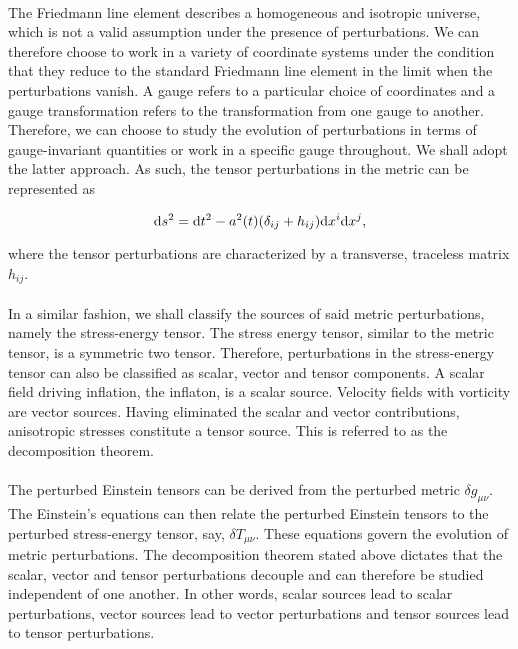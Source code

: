 \documentclass[12pt,a4paper,oneside]{book}
\begin{document}
\paragraph*{} The Friedmann line element describes a homogeneous and isotropic universe, which is not a valid assumption 
under the presence of perturbations. We can therefore choose to work in a variety of coordinate systems under the condition 
that they reduce to the standard Friedmann line element in the limit when the perturbations vanish. A gauge refers to a 
particular choice of coordinates and a gauge transformation refers to the transformation from one gauge to another. 
Therefore, we can choose to study the evolution of perturbations in terms of gauge-invariant quantities or work in a 
specific gauge throughout. We shall adopt the latter approach. As such, the tensor perturbations in the metric can be 
represented as 

\begin{equation}\label{tpmetric}
{\rm d}s^2 = {\rm d}t^2 - a^2(t)(\delta_{ij} + h_{ij}){\rm d}x^i{\rm d}x^j,
\end{equation}

\noindent where the tensor perturbations are characterized by a transverse, traceless matrix $h_{ij}$. 

\paragraph*{}  In a similar fashion, we shall classify the sources of said metric perturbations, namely the stress-energy tensor. 
The stress energy tensor, similar to the metric tensor, is a symmetric two tensor. Therefore, perturbations in the stress-energy 
tensor can also be classified as scalar, vector and tensor components. A scalar field driving inflation, the inflaton, is a 
scalar source. Velocity fields with vorticity are vector sources. Having eliminated the scalar and vector contributions, 
anisotropic stresses constitute a tensor source. This is referred to as the decomposition theorem.

\paragraph*{} The perturbed Einstein tensors can be derived from the perturbed metric $\delta g_{\mu\nu}$. 
The Einstein's equations can then relate the perturbed Einstein tensors to the perturbed stress-energy tensor, say, $\delta T_{\mu\nu}$. 
These equations govern the evolution of metric perturbations. The decomposition theorem stated above dictates that the scalar, vector and tensor 
perturbations decouple and can therefore be studied independent of one another. In other words, scalar sources lead to 
scalar perturbations, vector sources lead to vector perturbations and tensor sources lead to tensor perturbations. 
\end{document}
